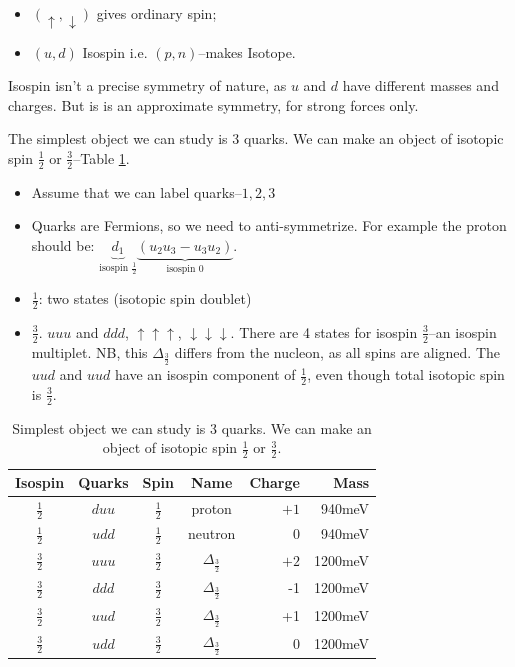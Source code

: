 \documentclass[]{article}
\begin{document}
\begin{itemize}
	\item $(\uparrow,\downarrow)$ gives ordinary spin;
	\item $(u,d)$ Isospin i.e.  $(p,n)$--makes Isotope.
\end{itemize}

Isospin isn't a precise symmetry of nature, as $u$ and $d$ have different masses and charges. But is is an approximate symmetry, for strong forces only.

The simplest object we can study is 3 quarks. We can make an object of isotopic spin $\frac{1}{2}$ or $\frac{3}{2}$--Table \ref{table:3quark}.

\begin{itemize}
	\item Assume that we can label quarks--${1,2,3}$
	\item Quarks are Fermions, so we need to anti-symmetrize. For example the proton should be: $\underbrace{d_1}_\text{isospin $\frac{1}{2}$}\underbrace{(u_2u_3-u_3u_2)}_\text{isospin 0}$.
	\item $\frac{1}{2}$: two states (isotopic spin doublet)
	\item $\frac{3}{2}$. $uuu$ and $ddd$, $\uparrow\uparrow\uparrow$, $\downarrow\downarrow\downarrow$. There are 4 states for isospin $\frac{3}{2}$--an isospin multiplet. NB, this $\Delta_\frac{3}{2}$ differs from the nucleon, as all spins are aligned. The $uud$ and $uud$ have an isospin component of $\frac{1}{2}$, even though total isotopic spin is $\frac{3}{2}$.
\end{itemize}

\begin{table}[H]
	\begin{center}
		\caption[Simplest object we can study is 3 quarks.]{Simplest object we can study is 3 quarks. We can make an object of isotopic spin $\frac{1}{2}$ or $\frac{3}{2}$.}\label{table:3quark}
		\begin{tabular}{|c|c|c|c|r|r|}\hline
			Isospin&Quarks&Spin&Name&Charge&Mass\\ \hline
			$\frac{1}{2}$&$duu$&$\frac{1}{2}$&proton&$+1$&940meV\\ \hline
			$\frac{1}{2}$&$udd$&$\frac{1}{2}$&neutron&0&940meV\\ \hline
			$\frac{3}{2}$&$uuu$&$\frac{3}{2}$&$\Delta_\frac{3}{2}$&$+2$&1200meV\\ \hline
			$\frac{3}{2}$&$ddd$&$\frac{3}{2}$&$\Delta_\frac{3}{2}$&-1&1200meV\\ \hline
			$\frac{3}{2}$&$uud$&$\frac{3}{2}$&$\Delta_\frac{3}{2}$&+1&1200meV\\ \hline
			$\frac{3}{2}$&$udd$&$\frac{3}{2}$&$\Delta_\frac{3}{2}$&0&1200meV\\ \hline
		\end{tabular}
	\end{center}
\end{table}
\end{document}
